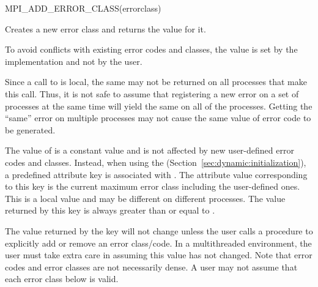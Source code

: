 \begin{funcdef}{MPI\_ADD\_ERROR\_CLASS}{(\mbox{errorclass})}
\end{funcdef}

Creates a new error class and returns the value for it.

\begin{rationale}
To avoid conflicts with existing error codes and classes, the value is
set by the implementation and not by the user.
\end{rationale}

\begin{users}
Since a call to  is local, the same
 may not be returned on all processes that make
this call.  Thus, it is not safe to assume that registering a new
error on a set of processes at the same time will yield the same
 on all of the processes. Getting the ``same''
error on multiple processes may not cause the same value of error
code to be generated.
\end{users}

The value of 
is a constant value and 
is not affected by new user-defined
error codes and classes.  
Instead, when using the \wpm{} (Section~\ref{sec:dynamic:initialization}), a predefined attribute key  is
associated with
.  The attribute value corresponding to this key
is the current maximum error class including the user-defined ones.
This is a local value and may be different on different processes.  
The value returned by this key is always greater than or equal to
.

\begin{users}
The value returned by the key
 will not change unless the user calls a
procedure to explicitly add or remove an error class/code.  In a multithreaded
environment, the user must take extra care in assuming this value has
not changed.
Note that error codes and error classes are not necessarily dense.  A user may not assume that each error class below  is valid.
\end{users}


